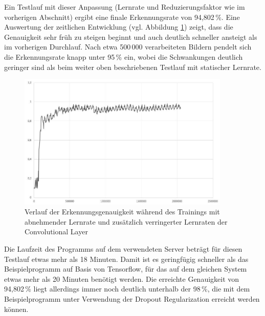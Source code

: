 \documentclass[../main.tex]{subfiles}
\begin{document}
Ein Testlauf mit dieser Anpassung (Lernrate und Reduzierungsfaktor wie im vorherigen Abschnitt) ergibt eine finale Erkennungsrate von 94,802\,\%. Eine Auswertung der zeitlichen Entwicklung (vgl. Abbildung \ref{pic:diagram_lr_convreduced}) zeigt, dass die Genauigkeit sehr früh zu steigen beginnt und auch deutlich schneller ansteigt als im vorherigen Durchlauf. Nach etwa 500\,000 verarbeiteten Bildern pendelt sich die Erkennungsrate knapp unter 95\,\% ein, wobei die Schwankungen deutlich geringer sind als beim weiter oben beschriebenen Testlauf mit statischer Lernrate. 
\begin{figure}
	\centering 
	\includegraphics[width=0.9\textwidth]{../images/Schmidt/convreduced_lr.jpg} 
	\caption {Verlauf der Erkennungsgenauigkeit während des Trainings mit abnehmender Lernrate und zusätzlich verringerter Lernraten der Convolutional Layer} 
	\label{pic:diagram_lr_convreduced} 
\end{figure} 
Die Laufzeit des Programms auf dem verwendeten Server beträgt für diesen Testlauf etwas mehr als 18 Minuten. Damit ist es geringfügig schneller als das Beispielprogramm auf Basis von Tensorflow, für das auf dem gleichen System etwas mehr als 20 Minuten benötigt werden. Die erreichte Genauigkeit von 94,802\,\% liegt allerdings immer noch deutlich unterhalb der 98\,\%, die mit dem Beispielprogramm unter Verwendung der Dropout Regularization erreicht werden können. 
\end{document}
